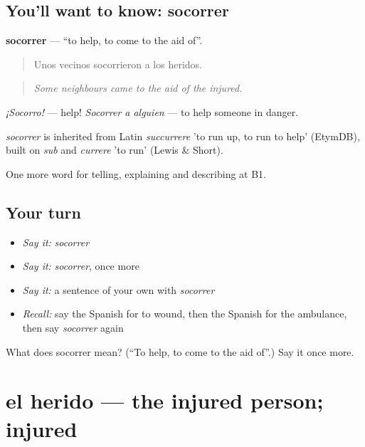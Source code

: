 \subsection*{You'll want to know: socorrer}
\textbf{socorrer} — \textquotedblleft{}to help, to come to the aid of\textquotedblright{}.

\begin{quote}
Unos vecinos socorrieron a los heridos.
\end{quote}

\begin{quote}
\emph{Some neighbours came to the aid of the injured.}
\end{quote}

\emph{¡Socorro!} — help! \emph{Socorrer a alguien} — to help someone in danger.

\begin{cousinweb}
\emph{socorrer} is inherited from Latin \emph{succurrere} 'to run up, to run to help' (EtymDB), built on \emph{sub} and \emph{currere} 'to run' (Lewis \& Short).
\end{cousinweb}

\begin{grammarlens}[title={What you've built}]
One more word for telling, explaining and describing at B1.
\end{grammarlens}

\subsection*{Your turn}
\begin{itemize}
\raggedright
  \item \emph{Say it:} \emph{socorrer}
  \item \emph{Say it:} \emph{socorrer}, once more
  \item \emph{Say it:} a sentence of your own with \emph{socorrer}
  \item \emph{Recall:} say the Spanish for to wound, then the Spanish for the ambulance, then say \emph{socorrer} again
\end{itemize}

\begin{tcolorbox}[breakable,colback=teal!4,colframe=teal!35!black,title={Before you move on}]
What does socorrer mean? (\textquotedblleft{}To help, to come to the aid of\textquotedblright{}.) Say it once more.
\end{tcolorbox}
\section[el herido]{el herido — the injured person; injured}


